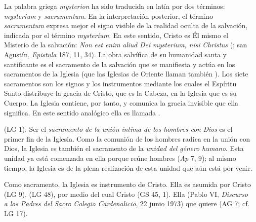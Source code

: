 	
	 La palabra griega \emph{mysterion} ha sido traducida en latín por dos términos: \emph{mysterium} y \emph{sacramentum}. En la interpretación posterior, el término \emph{sacramentum} expresa mejor el signo visible de la realidad oculta de la salvación, indicada por el término \emph{mysterium}. En este sentido, Cristo es Él mismo el Misterio de la salvación: \emph{Non est enim aliud Dei mysterium, nisi Christus} (; san Agustín, \emph{Epistula} 187, 11, 34). La obra salvífica de su humanidad santa y santificante es el sacramento de la salvación que se manifiesta y actúa en los sacramentos de la Iglesia (que las Iglesias de Oriente llaman también ). Los siete sacramentos son los signos y los instrumentos mediante los cuales el Espíritu Santo distribuye la gracia de Cristo, que es la Cabeza, en la Iglesia que es su Cuerpo. La Iglesia contiene, por tanto, y comunica la gracia invisible que ella significa. En este sentido analógico ella es llamada .
	
	  (LG 1): Ser el \emph{sacramento de la unión íntima de los hombres con Dios} es el primer fin de la Iglesia. Como la comunión de los hombres radica en la unión con Dios, la Iglesia es también el sacramento de la \emph{unidad del género humano}. Esta unidad ya está comenzada en ella porque reúne hombres  (\emph{Ap} 7, 9); al mismo tiempo, la Iglesia es  de la plena realización de esta unidad que aún está por venir.
	
	 Como sacramento, la Iglesia es instrumento de Cristo. Ella es asumida por Cristo  (LG 9),  (LG 48), por medio del cual Cristo  (GS 45, 1). Ella  (Pablo VI, \emph{Discurso a los Padres del Sacro Colegio Cardenalicio}, 22 junio 1973) que quiere  (AG 7; cf. LG 17).
	
